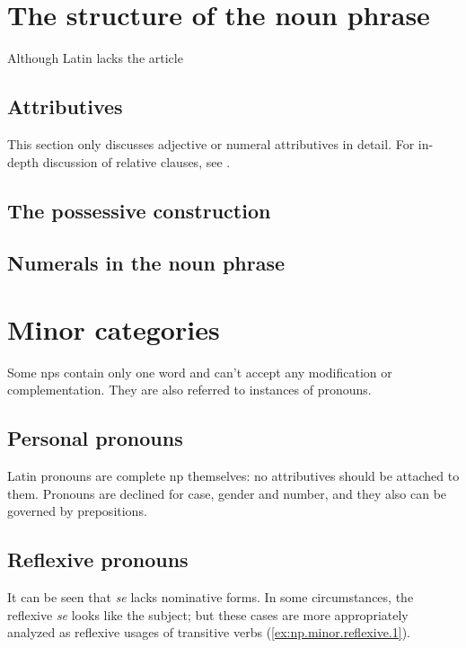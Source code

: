 \documentclass[a4paper, oneside]{report}
\newcommand{\form}[1]{\emph{#1}}
\begin{document}
\section{The structure of the noun phrase}

Although Latin lacks the article 

\subsection{Attributives}

This section only discusses adjective or numeral attributives in detail.
For in-depth discussion of relative clauses, see .


\subsection{The possessive construction}

\subsection{Numerals in the noun phrase}

\section{Minor categories}

Some \acs{np}s contain only one word and can't accept any modification or complementation.
They are also referred to instances of pronouns.

\subsection{Personal pronouns}\label{sec:np.pronoun}

Latin pronouns are complete \acs{np} themselves:
no attributives should be attached to them. 
Pronouns are declined for case, gender and number,
and they also can be governed by prepositions.

\subsection{Reflexive pronouns}

It can be seen that \form{se} lacks nominative forms.
In some circumstances, 
the reflexive \form{se} looks like the subject;
but these cases are more appropriately analyzed 
as reflexive usages of transitive verbs
(\ref{ex:np.minor.reflexive.1}).
\end{document}
